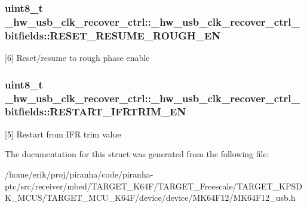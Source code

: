 \subsubsection[{\texorpdfstring{R\+E\+S\+E\+T\+\_\+\+R\+E\+S\+U\+M\+E\+\_\+\+R\+O\+U\+G\+H\+\_\+\+EN}{RESET_RESUME_ROUGH_EN}}]{\setlength{\rightskip}{0pt plus 5cm}uint8\+\_\+t \+\_\+hw\+\_\+usb\+\_\+clk\+\_\+recover\+\_\+ctrl\+::\+\_\+hw\+\_\+usb\+\_\+clk\+\_\+recover\+\_\+ctrl\+\_\+bitfields\+::\+R\+E\+S\+E\+T\+\_\+\+R\+E\+S\+U\+M\+E\+\_\+\+R\+O\+U\+G\+H\+\_\+\+EN}\hypertarget{struct__hw__usb__clk__recover__ctrl_1_1__hw__usb__clk__recover__ctrl__bitfields_adc4bb268bff09d734f4a87eab6a5a4f9}{}\label{struct__hw__usb__clk__recover__ctrl_1_1__hw__usb__clk__recover__ctrl__bitfields_adc4bb268bff09d734f4a87eab6a5a4f9}
\mbox{[}6\mbox{]} Reset/resume to rough phase enable 
\subsubsection[{\texorpdfstring{R\+E\+S\+T\+A\+R\+T\+\_\+\+I\+F\+R\+T\+R\+I\+M\+\_\+\+EN}{RESTART_IFRTRIM_EN}}]{\setlength{\rightskip}{0pt plus 5cm}uint8\+\_\+t \+\_\+hw\+\_\+usb\+\_\+clk\+\_\+recover\+\_\+ctrl\+::\+\_\+hw\+\_\+usb\+\_\+clk\+\_\+recover\+\_\+ctrl\+\_\+bitfields\+::\+R\+E\+S\+T\+A\+R\+T\+\_\+\+I\+F\+R\+T\+R\+I\+M\+\_\+\+EN}\hypertarget{struct__hw__usb__clk__recover__ctrl_1_1__hw__usb__clk__recover__ctrl__bitfields_ac3d8de6d30770d76e1a62d304ef26ee5}{}\label{struct__hw__usb__clk__recover__ctrl_1_1__hw__usb__clk__recover__ctrl__bitfields_ac3d8de6d30770d76e1a62d304ef26ee5}
\mbox{[}5\mbox{]} Restart from I\+FR trim value 

The documentation for this struct was generated from the following file\+:\begin{DoxyCompactItemize}
\item 
/home/erik/proj/piranha/code/piranha-\/ptc/src/receiver/mbed/\+T\+A\+R\+G\+E\+T\+\_\+\+K64\+F/\+T\+A\+R\+G\+E\+T\+\_\+\+Freescale/\+T\+A\+R\+G\+E\+T\+\_\+\+K\+P\+S\+D\+K\+\_\+\+M\+C\+U\+S/\+T\+A\+R\+G\+E\+T\+\_\+\+M\+C\+U\+\_\+\+K64\+F/device/device/\+M\+K64\+F12/M\+K64\+F12\+\_\+usb.\+h\end{DoxyCompactItemize}
